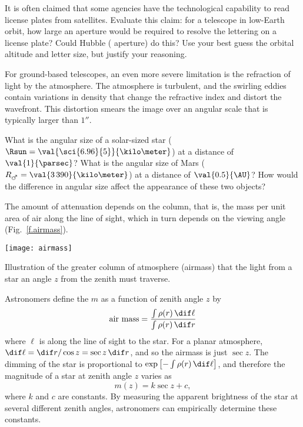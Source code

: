 \begin{exercisebox}
It is often claimed that some agencies have the technological capability to read license plates from satellites. Evaluate this claim: for a telescope in low-Earth orbit, how large an aperture would be required to resolve the lettering on a license plate? Could Hubble ( aperture) do this? Use your best guess the orbital altitude and letter size, but justify your reasoning.
\end{exercisebox}

For ground-based telescopes, an even more severe limitation is the refraction of light by the atmosphere. The atmosphere is turbulent, and the swirling eddies contain variations in density that change the refractive index and distort the wavefront.  This distortion smears the image over an angular scale that is typically larger than $1''$.

\begin{exercisebox}
What is the angular size of a solar-sized star ($\Rsun = \val{\sci{6.96}{5}}{\kilo\meter}$) at a distance of $\val{1}{\parsec}$?  What is the angular size of Mars ($R_{\mars} = \val{3\,390}{\kilo\meter}$) at a distance of $\val{0.5}{\AU}$?  How would the difference in angular size affect the appearance of these two objects?
\end{exercisebox}

 The amount of attenuation depends on the column, that is, the mass per unit area of air along the line of sight, which in turn depends on the viewing angle (Fig.~\ref{f.airmass}).

\begin{marginfigure}
\texttt{[image: airmass]}
\caption[Illustration of airmass]{Illustration of the greater column of atmosphere (airmass) that the light from a star an angle $z$ from the zenith must traverse.}
\label{f.airmass}
\end{marginfigure}

Astronomers define the  $m$ as a function of zenith angle $z$ by
\[
	\textrm{air mass} = \frac{\int\rho(r)\,\dif \ell}{\int\rho(r)\,\dif r}
\]
where $\ell$ is along the line of sight to the star.  For a planar atmosphere, $\dif\ell = \dif r/\cos z = \sec z\,\dif r$, and so the airmass is just $\sec z$.  The dimming of the star is proportional to $\exp\left[-\int\rho(r)\,\dif\ell\right]$, and therefore the magnitude of a star at zenith angle $z$ varies as
\[ m(z) = k \sec z + c, \]
where $k$ and $c$ are constants.  By measuring the apparent brightness of the star at several different zenith angles, astronomers can empirically determine these constants.
